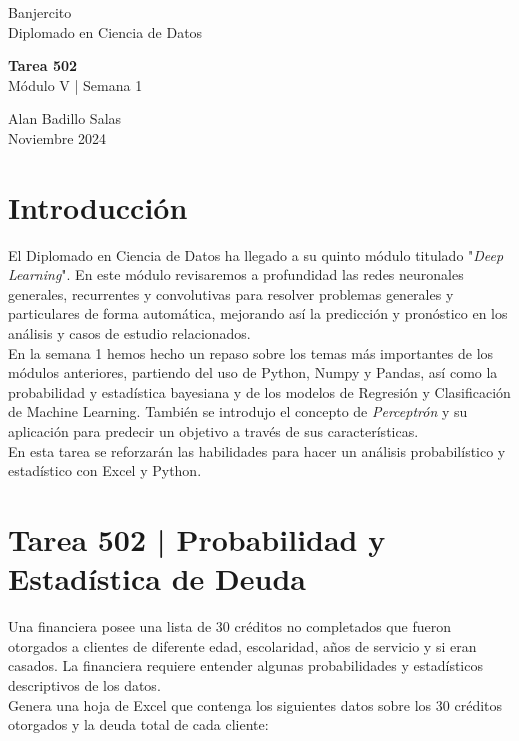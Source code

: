 \documentclass{article}
\begin{document}
\begin{flushleft}
    \LARGE Banjercito \\[6pt]
    \Large Diplomado en Ciencia de Datos
\end{flushleft}

\vfill

\begin{flushleft}
    \LARGE \textbf{Tarea 502} \\[12pt]
    \LARGE Módulo V | Semana 1 \\[24pt]
\end{flushleft}

\vfil

\begin{flushleft}
    Alan Badillo Salas \\[12pt]
    Noviembre 2024 \\[24pt]
\end{flushleft}

\vfill

\section*{Introducción}
El Diplomado en Ciencia de Datos ha llegado a su quinto módulo titulado "\textit{Deep Learning}". En este módulo revisaremos a profundidad las redes neuronales generales, recurrentes y convolutivas para resolver problemas generales y particulares de forma automática, mejorando así la predicción y pronóstico en los análisis y casos de estudio relacionados.
\\[12pt]
En la semana 1 hemos hecho un repaso sobre los temas más importantes de los módulos anteriores, partiendo del uso de Python, Numpy y Pandas, así como la probabilidad y estadística bayesiana y de los modelos de Regresión y Clasificación de Machine Learning. También se introdujo el concepto de \textit{Perceptrón} y su aplicación para predecir un objetivo a través de sus características.
\\[12pt]
En esta tarea se reforzarán las habilidades para hacer un análisis probabilístico y estadístico con Excel y Python.

\clearpage

\section*{Tarea 502 | Probabilidad y Estadística de Deuda}

Una financiera posee una lista de 30 créditos no completados que fueron otorgados a clientes de diferente edad, escolaridad, años de servicio y si eran casados. La financiera requiere entender algunas probabilidades y estadísticos descriptivos de los datos.
\\[12pt]
Genera una hoja de Excel que contenga los siguientes datos sobre los 30 créditos otorgados y la deuda total de cada cliente:
\end{document}
